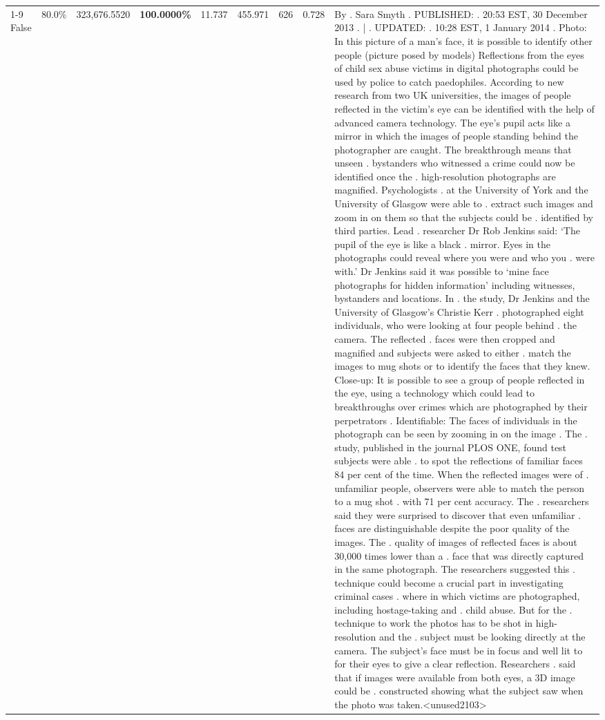 \begin{table}[H]
\begin{tabular}{lllrlllll}
\cline{1-9}
False & 80.0\% & 323,676.5520 & \bfseries \color{red} 100.0000\% & 11.737 & 455.971 & 626 & 0.728 & By . Sara Smyth . PUBLISHED: . 20:53 EST, 30 December 2013 . | . UPDATED: . 10:28 EST, 1 January 2014 . Photo: In this picture of a man's face, it is possible to identify other people (picture posed by models) Reflections from the eyes of child sex abuse victims in digital photographs could be used by police to catch paedophiles. According to new research from two UK universities, the images of people reflected in the victim's eye can be identified with the help of advanced camera technology. The eye's pupil acts like a mirror in which the images of people standing behind the photographer are caught. The breakthrough means that unseen . bystanders who witnessed a crime could now be identified once the . high-resolution photographs are magnified. Psychologists . at the University of York and the University of Glasgow were able to . extract such images and zoom in on them so that the subjects could be . identified by third parties. Lead . researcher Dr Rob Jenkins said: ‘The pupil of the eye is like a black . mirror. Eyes in the photographs could reveal where you were and who you . were with.' Dr Jenkins said it was possible to ‘mine face photographs for hidden information' including witnesses, bystanders and locations. In . the study, Dr Jenkins and the University of Glasgow's Christie Kerr . photographed eight individuals, who were looking at four people behind . the camera. The reflected . faces were then cropped and magnified and subjects were asked to either . match the images to mug shots or to identify the faces that they knew. Close-up: It is possible to see a group of people reflected in the eye, using a technology which could lead to breakthroughs over crimes which are photographed by their perpetrators . Identifiable: The faces of individuals in the photograph can be seen by zooming in on the image . The . study, published in the journal PLOS ONE, found test subjects were able . to spot the reflections of familiar faces 84 per cent of the time. When the reflected images were of . unfamiliar people, observers were able to match the person to a mug shot . with 71 per cent accuracy. The . researchers said they were surprised to discover that even unfamiliar . faces are distinguishable despite the poor quality of the images. The . quality of images of reflected faces is about 30,000 times lower than a . face that was directly captured in the same photograph. The researchers suggested this . technique could become a crucial part in investigating criminal cases . where in which victims are photographed, including hostage-taking and . child abuse. But for the . technique to work the photos has to be shot in high-resolution and the . subject must be looking directly at the camera. The subject's face must be in focus and well lit to for their eyes to give a clear reflection. Researchers . said that if images were available from both eyes, a 3D image could be . constructed showing what the subject saw when the photo was taken.<unused2103> \\

\end{tabular}
\end{table}
